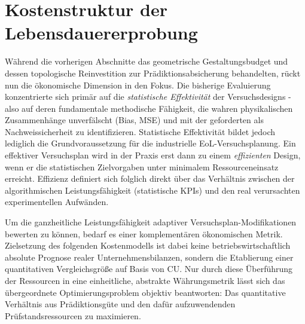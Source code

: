 \section{Kostenstruktur der Lebensdauererprobung} \label{sec:kostenmodell}
Während die vorherigen Abschnitte das geometrische Gestaltungsbudget und dessen topologische Reinvestition zur Prädiktionsabsicherung behandelten, rückt nun die ökonomische Dimension in den Fokus.
Die bisherige Evaluierung konzentrierte sich primär auf die \textit{statistische Effektivität} der Versuchsdesigns - also auf deren fundamentale methodische Fähigkeit, die wahren physikalischen Zusammenhänge unverfälscht (Bias, \ac{MSE}) und mit der geforderten  als Nachweissicherheit zu identifizieren.
Statistische Effektivität bildet jedoch lediglich die Grundvoraussetzung für die industrielle \ac{EoL}-Versuchsplanung.
Ein effektiver Versuchsplan wird in der Praxis erst dann zu einem \textit{effizienten} Design, wenn er die statistischen Zielvorgaben unter minimalem Ressourceneinsatz erreicht.
Effizienz definiert sich folglich direkt über das Verhältnis zwischen der algorithmischen Leistungsfähigkeit (statistische \acp{KPI}) und den real verursachten experimentellen Aufwänden.

Um die ganzheitliche Leistungsfähigkeit adaptiver Versuchsplan-Modifikationen bewerten zu können, bedarf es einer komplementären ökonomischen Metrik.
Zielsetzung des folgenden Kostenmodells ist dabei keine betriebswirtschaftlich absolute Prognose realer Unternehmensbilanzen, sondern die Etablierung einer quantitativen Vergleichsgröße auf Basis von \ac{CU}.
Nur durch diese Überführung der Ressourcen in eine einheitliche, abstrakte Währungsmetrik lässt sich das übergeordnete Optimierungsproblem objektiv beantworten: Das quantitative Verhältnis aus Prädiktionsgüte und den dafür aufzuwendenden Prüfstandsressourcen zu maximieren.

